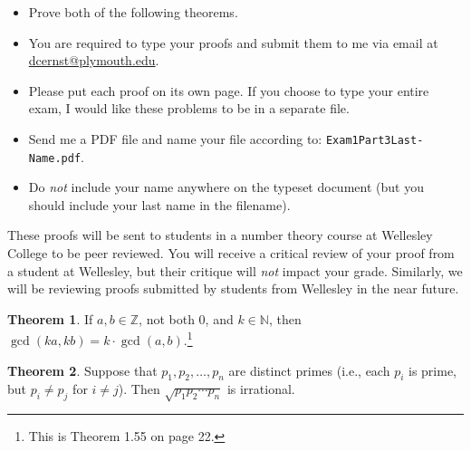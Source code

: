 \documentclass[11pt]{article}
\theoremstyle{definition}
\newtheorem{theorem}{Theorem}
\begin{document}
\begin{itemize}

\item Prove both of the following theorems.

\item You are required to type your proofs and submit them to me via email at \url{dcernst@plymouth.edu}.  

\item Please put each proof on its own page.  If you choose to type your entire exam, I would like these problems to be in a separate file.  

\item Send me a PDF file and name your file according to: \texttt{Exam1Part3Last-Name.pdf}.  

\item Do \emph{not} include your name anywhere on the typeset document (but you should include your last name in the filename).

\end{itemize}

These proofs will be sent to students in a number theory course at Wellesley College to be peer reviewed.  You will receive a critical review of your proof from a student at Wellesley, but their critique will \emph{not} impact your grade.  Similarly, we will be reviewing proofs submitted by students from Wellesley in the near future.

\begin{theorem}
If $a,b\in\mathbb{Z}$, not both 0, and $k\in\mathbb{N}$, then $\gcd(ka,kb)=k\cdot \gcd(a,b)$.\footnote{This is Theorem 1.55 on page 22.}
\end{theorem}

\begin{theorem}
Suppose that $p_{1}, p_{2}, \ldots, p_{n}$ are distinct primes (i.e., each $p_{i}$ is prime, but $p_{i}\neq p_{j}$ for $i\neq j$).  Then $\sqrt{p_{1}p_{2}\cdots p_{n}}$ is irrational.
\end{theorem}
\end{document}
